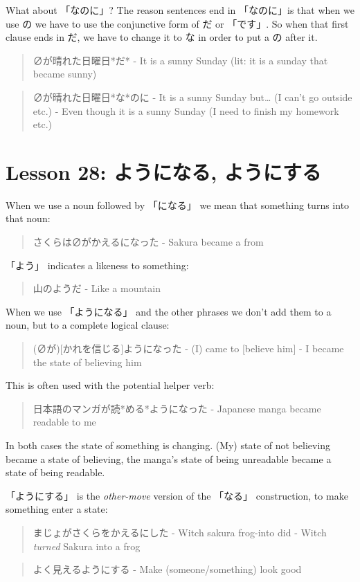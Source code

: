 \documentclass[11pt]{article}
\begin{document}
What about 「なのに」? The reason sentences end in 「なのに」is that when we use の we have to use the conjunctive form of だ or 「です」. So when that first clause ends in だ, we have to change it to な in order to put a の after it.
\begin{quote}
∅が晴れた日曜日*だ* - It is a sunny Sunday (lit: it is a sunday that became sunny)
\end{quote}
\begin{quote}
∅が晴れた日曜日*な*のに - It is a sunny Sunday but\ldots{} (I can't go outside etc.) - Even though it is a sunny Sunday (I need to finish my homework etc.)
\end{quote}
\section{Lesson 28: ようになる, ようにする}
\label{sec:orgbf648cd}
When we use a noun followed by 「になる」 we mean that something turns into that noun:
\begin{quote}
さくらは∅がかえるになった - Sakura became a from
\end{quote}

「よう」 indicates a likeness to something:
\begin{quote}
山のようだ - Like a mountain
\end{quote}

When we use 「ようになる」 and the other phrases we don't add them to a noun, but to a complete logical clause:
\begin{quote}
(∅が)[かれを信じる]ようになった - (I) came to [believe him] - I became the state of believing him
\end{quote}

This is often used with the potential helper verb:
\begin{quote}
日本語のマンガが読*める*ようになった - Japanese manga became readable to me
\end{quote}

In both cases the state of something is changing. (My) state of not believing became a state of believing, the manga's state of being unreadable became a state of being readable.

「ようにする」 is the \emph{other-move} version of the 「なる」 construction, to make something enter a state:
\begin{quote}
まじょがさくらをかえるにした - Witch sakura frog-into did - Witch \emph{turned} Sakura into a frog
\end{quote}
\begin{quote}
よく見えるようにする - Make (someone/something) look good
\end{quote}
\end{document}
